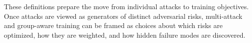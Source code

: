 These definitions prepare the move from individual attacks to training objectives. Once attacks are viewed as generators of distinct adversarial risks, multi-attack and group-aware training can be framed as choices about which risks are optimized, how they are weighted, and how hidden failure modes are discovered.
